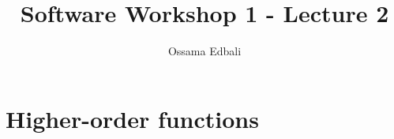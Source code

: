 \documentclass{article}
\title{Software Workshop 1 - Lecture 2}
\author{Ossama Edbali}
\begin{document}
	\maketitle
	
	\section{Higher-order functions}
		
	
	
\end{document}
